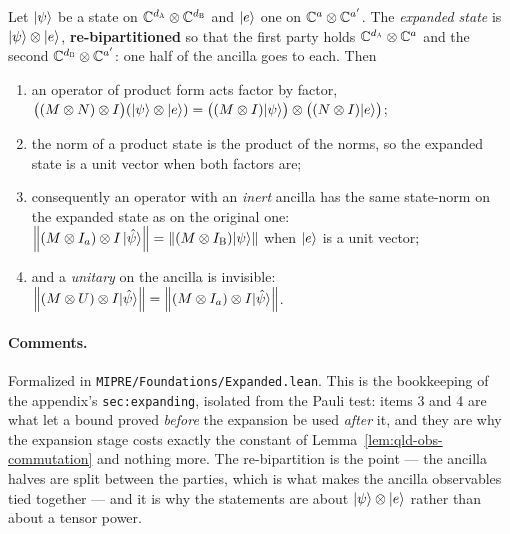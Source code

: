 \begin{definition}
\label{def:expanded-state}
\leanok
Let $|\psi\rangle$ be a state on $\mathbb{C}^{d_{\textsc{A}}} \otimes \mathbb{C}^{d_{\textsc{B}}}$ and $|e\rangle$ one on
$\mathbb{C}^{a} \otimes \mathbb{C}^{a'}$. The \emph{expanded state} is $|\psi\rangle \otimes |e\rangle$, \textbf{re-bipartitioned}
so that the first party holds $\mathbb{C}^{d_{\textsc{A}}} \otimes \mathbb{C}^{a}$ and the second $\mathbb{C}^{d_{\textsc{B}}} \otimes \mathbb{C}^{a'}$:
one half of the ancilla goes to each. Then
\begin{enumerate}
\item an operator of product form acts factor by factor,
  $\bigl((M \otimes N) \otimes I\bigr)(|\psi\rangle \otimes |e\rangle)
   = \bigl((M \otimes I)|\psi\rangle\bigr) \otimes \bigl((N \otimes I)|e\rangle\bigr)$;
\item the norm of a product state is the product of the norms, so the expanded state is a unit
  vector when both factors are;
\item consequently an operator with an \emph{inert} ancilla has the same state-norm on the expanded
  state as on the original one: $\left\| {(M \otimes I_a) \otimes I \,|\hat\psi\rangle} \right\| =
  \left\| {(M \otimes I_{\textsc{B}})|\psi\rangle} \right\|$ when $|e\rangle$ is a unit vector;
\item and a \emph{unitary} on the ancilla is invisible:
  $\left\| {(M \otimes U) \otimes I |\hat\psi\rangle} \right\| = \left\| {(M \otimes I_a) \otimes I |\hat\psi\rangle} \right\|$.
\end{enumerate}
\end{definition}

\paragraph{Comments.} Formalized in \texttt{MIPRE/Foundations/Expanded.lean}. This is the
bookkeeping of the appendix's \texttt{sec:expanding}, isolated from the Pauli test: items 3 and 4 are
what let a bound proved \emph{before} the expansion be used \emph{after} it, and they are why the
expansion stage costs exactly the constant of Lemma~\ref{lem:qld-obs-commutation} and nothing more.
The re-bipartition is the point --- the ancilla halves are split between the parties, which is what
makes the ancilla observables tied together --- and it is why the statements are about
$|\psi\rangle \otimes |e\rangle$ rather than about a tensor power.

